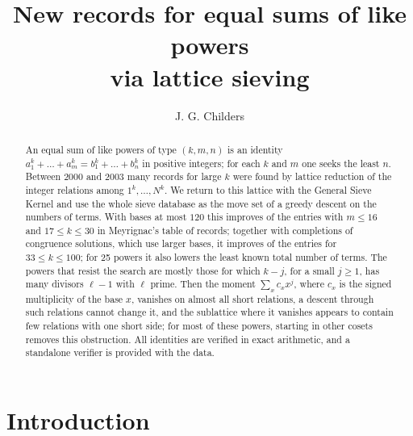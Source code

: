 \documentclass[11pt]{amsart}
\theoremstyle{definition}
\theoremstyle{remark}
\begin{document}
\title[New records for equal sums of like powers]{New records for equal sums of like powers\\ via lattice sieving}

\author{J. G. Childers}
\address{Department of Physics, California State University, Fullerton, 800 N. State College Blvd., Fullerton, CA 92831, USA}


\begin{abstract}
An equal sum of like powers of type $(k,m,n)$ is an identity
$a_1^k+\dots+a_m^k=b_1^k+\dots+b_n^k$ in positive integers; for each $k$ and $m$ one seeks
the least $n$. Between 2000 and 2003 many records for large $k$ were found by lattice reduction
of the integer relations among $1^k,\dots,N^k$. We return to this lattice with the General
Sieve Kernel and use the whole sieve database as the move set of a greedy descent on the
numbers of terms. With bases at most $120$ this improves \NumImproved{} of the \NumCells{}
entries with $m\le16$ and $17\le k\le30$ in Meyrignac's table of records; together with
completions of congruence solutions, which use larger bases, it improves \HNumImproved{} of the
\HNumCells{} entries for $33\le k\le100$; for 25 powers it also lowers the least known total number of terms. The
powers that resist the search are mostly those for which $k-j$, for a small $j\ge1$, has many
divisors $\ell-1$ with $\ell$ prime. Then the moment $\sum_x c_xx^j$, where $c_x$ is the signed
multiplicity of the base $x$, vanishes on almost all short
relations, a descent through such relations cannot change it, and the sublattice where it
vanishes appears to contain few relations with one short side; for most of these powers,
starting in other cosets removes this obstruction. All identities are verified in exact arithmetic,
and a standalone verifier is provided with the data.
\end{abstract}

\maketitle

\section{Introduction}
\end{document}
